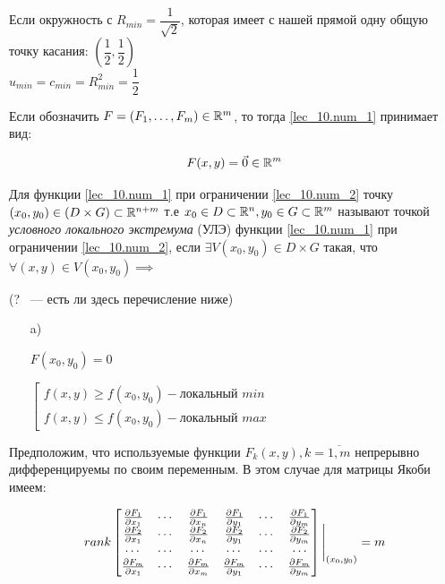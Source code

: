 \documentclass[../../main.tex]{subfiles}
\begin{document}
\begin{example}
	Если окружность с $R_{min} = \dfrac{1}{ \sqrt{2} }$, 
	которая имеет с нашей прямой одну общую точку касания: 
	$\left( \dfrac{1}{2}, \dfrac{1}{2} \right)$ \\
	$u_{min} = c_{min} = R^2_{min} = \dfrac{1}{2}$
	
	Если обозначить $F = \left( F_1, \ldots, F_m \right) \in \mathbb{R}^m$, 
	то тогда \ref{lec_10.num_1} принимает вид:
	
	\begin{equation} \label{lec_10.num_2}
		F(x, y) = \vec{0} \in \mathbb{R}^m
	\end{equation}
	
	Для функции \ref{lec_10.num_1} при ограничении \ref{lec_10.num_2}
	точку $(x_0, y_0) \in \left( D \times G \right) 
	\subset \mathbb{R}^{n+m}$
	т.е $x_0 \in D \subset \mathbb{R}^n , y_0 \in G \subset \mathbb{R}^m$ называют точкой 
	\emph{условного локального экстремума} (УЛЭ) функции 
	\ref{lec_10.num_1} при ограничении \ref{lec_10.num_2}, если
	$\exists V\left( x_0, y_0 \right) \in D \times G $ такая, что 
	$\forall \left( x, y \right) \in V\left( x_0, y_0 \right) \implies $
	
	(? ~--- есть ли здесь перечисление ниже)
	\begin{itemize}
		\item[a)] 
		
		$F(x_0, y_0) = 0$
		
		$\left[ \begin{gathered}
		f(x,y) \ge f(x_0, y_0) -  \text{локальный } min \\
		f(x, y) \le f(x_0, y_0) - \text{локальный } max 
		\end{gathered} \right.$
	
	\end{itemize}
		
Предположим, что используемые функции $F_k(x,y), k = \overline{1, m}$ 
непрерывно дифференцируемы по своим переменным. В этом случае для 
матрицы Якоби имеем:

\begin{equation} \label{lec_10.num_3}
	rank \begin{bmatrix}
	\frac{\partial F_1}{\partial x_1} & \cdots & \frac{\partial F_1}{\partial x_n} & 
	\frac{\partial F_1}{\partial y_1} & \cdots & \frac{\partial F_1}{\partial y_m} \\
	\frac{\partial F_2}{\partial x_1} & \cdots & \frac{\partial F_2}{\partial x_n} &
	\frac{\partial F_2}{\partial y_1} & \cdots & \frac{\partial F_2}{\partial y_m} \\
	\cdots & \cdots & \cdots & \cdots & \cdots & \cdots \\
	\frac{\partial F_m}{\partial x_1} & \cdots & \frac{\partial F_m}{\partial x_m} &
	\frac{\partial F_m}{\partial y_1} & \cdots & \frac{\partial F_m}{\partial y_m}
	\end{bmatrix}
	\Bigg|_{(x_0, y_0)} = m
\end{equation} 		
		

\end{example}
\end{document}
